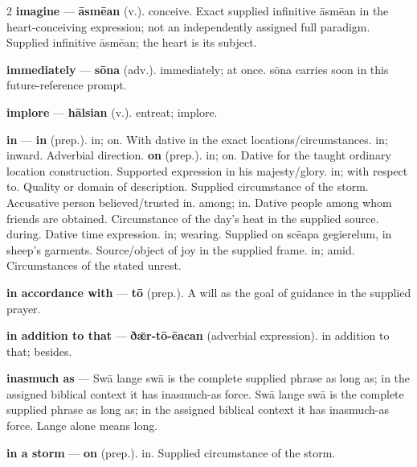 \begin{multicols}{2}
\textbf{imagine} — \textbf{āsmēan} (v.). conceive. Exact supplied infinitive āsmēan in the heart-conceiving expression; not an independently assigned full paradigm. Supplied infinitive āsmēan; the heart is its subject.\par
\textbf{immediately} — \textbf{sōna} (adv.). immediately; at once. sōna carries soon in this future-reference prompt.\par
\textbf{implore} — \textbf{hālsian} (v.). entreat; implore.\par
\textbf{in} — \textbf{in} (prep.). in; on. With dative in the exact locations/circumstances. in; inward. Adverbial direction. \textbf{on} (prep.). in; on. Dative for the taught ordinary location construction. Supported expression in his majesty/glory. in; with respect to. Quality or domain of description. Supplied circumstance of the storm. Accusative person believed/trusted in. among; in. Dative people among whom friends are obtained. Circumstance of the day's heat in the supplied source. during. Dative time expression. in; wearing. Supplied on scēapa gegierelum, in sheep's garments. Source/object of joy in the supplied frame. in; amid. Circumstances of the stated unrest.\par
\textbf{in accordance with} — \textbf{tō} (prep.). A will as the goal of guidance in the supplied prayer.\par
\textbf{in addition to that} — \textbf{ðǣr-tō-ēacan} (adverbial expression). in addition to that; besides.\par
\textbf{inasmuch as} — Swā lange swā is the complete supplied phrase as long as; in the assigned biblical context it has inasmuch-as force. Swā lange swā is the complete supplied phrase as long as; in the assigned biblical context it has inasmuch-as force. Lange alone means long.\par
\textbf{in a storm} — \textbf{on} (prep.). in. Supplied circumstance of the storm.\par

\end{multicols}
